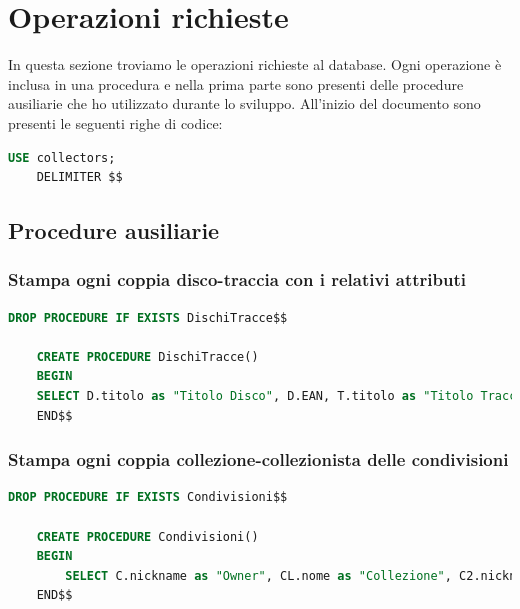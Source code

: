 \documentclass{article}
\begin{document}
    \section{Operazioni richieste}
    In questa sezione troviamo le operazioni richieste al database. Ogni operazione è inclusa in una procedura e nella prima parte sono presenti delle procedure ausiliarie che ho utilizzato durante lo sviluppo.
    All'inizio del documento sono presenti le seguenti righe di codice:

    \begin{lstlisting}[language=SQL]
    USE collectors;
    DELIMITER $$
\end{lstlisting}

\subsection{Procedure ausiliarie}


\subsubsection{Stampa ogni coppia disco-traccia con i relativi attributi}
\begin{lstlisting}[language=SQL]
    DROP PROCEDURE IF EXISTS DischiTracce$$
    
    CREATE PROCEDURE DischiTracce() 
    BEGIN
    SELECT D.titolo as "Titolo Disco", D.EAN, T.titolo as "Titolo Traccia", T.ISRC, T.durata, A.nomeDarte as "Autore principale" FROM Disco D, Traccia T, Contiene C, Autore A WHERE D.id = C.id_disco AND T.id = C.id_traccia AND A.id = D.id_autore ORDER BY D.titolo;
    END$$
\end{lstlisting}

\subsubsection{Stampa ogni coppia collezione-collezionista delle condivisioni}
\begin{lstlisting}[language=SQL]
    DROP PROCEDURE IF EXISTS Condivisioni$$
    
    CREATE PROCEDURE Condivisioni()
    BEGIN
        SELECT C.nickname as "Owner", CL.nome as "Collezione", C2.nickname as "Guest" FROM Collezionista C, Collezione CL, Collezionista C2, Condivide CO WHERE CL.isPubblica = false AND CL.id_collezionista = C.id AND CL.id = CO.id_collezione AND C2.id = CO.id_collezionista;
    END$$
\end{lstlisting}
\end{document}
